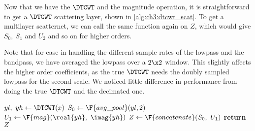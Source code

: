 Now that we have the $\DTCWT$ and the magnitude operation, it is straightforward
to get a $\DTCWT$ scattering layer, shown in \autoref{alg:ch3:dtcwt_scat}. To
get a multilayer scatternet, we can call the same function again on $Z$, which
would give $S_0,\ S_1$ and $U_2$ and so on for higher orders. 

Note that for ease in handling the different sample rates of the lowpass and the
bandpass, we have averaged the lowpass over a $2\x 2$ window. This slightly
affects the higher order coefficients, as the true $\DTCWT$ needs the doubly
sampled lowpass for the second scale. We noticed little difference in
performance from doing the true $\DTCWT$ and the decimated one.

\begin{algorithm}[tb]
  \label{alg:ch3:dtcwt_scat}
\begin{algorithmic}[1]
  \State $yl,\ yh \gets \DTCWT(x)$
  \State $S_0 \gets \F{avg\_pool}(yl, 2)$ 
  \State $U_1 \gets \F{mag}(\real{yh},\ \imag{yh})$ 
  \State $Z \gets \F{concatenate}(S_0,\ U_1)$ 
  \State \textbf{return} $Z$
\EndFunction
\end{algorithmic}
\end{algorithm}
